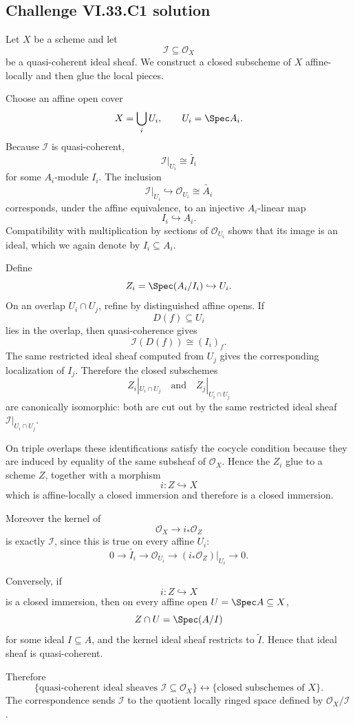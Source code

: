 
\subsection*{Challenge VI.33.C1 solution}
\begin{solution}
Let \(X\) be a scheme and let
\[
\mathcal I\subseteq\mathcal O_X
\]
be a quasi-coherent ideal sheaf.  We construct a closed subscheme of \(X\) affine-locally and then glue the local
pieces.

Choose an affine open cover
\[
X=\bigcup_iU_i,
\qquad
U_i=\Spec A_i.
\]
Because \(\mathcal I\) is quasi-coherent,
\[
\mathcal I|_{U_i}\cong\widetilde{I_i}
\]
for some \(A_i\)-module \(I_i\).  The inclusion
\[
\mathcal I|_{U_i}\hookrightarrow\mathcal O_{U_i}\cong\widetilde{A_i}
\]
corresponds, under the affine equivalence, to an injective \(A_i\)-linear map
\[
I_i\hookrightarrow A_i.
\]
Compatibility with multiplication by sections of \(\mathcal O_{U_i}\) shows that its image is an ideal, which we
again denote by \(I_i\subseteq A_i\).

Define
\[
Z_i=\Spec(A_i/I_i)
\hookrightarrow
U_i.
\]
On an overlap \(U_i\cap U_j\), refine by distinguished affine opens.  If
\[
D(f)\subseteq U_i
\]
lies in the overlap, then quasi-coherence gives
\[
\mathcal I(D(f))
\cong
(I_i)_f.
\]
The same restricted ideal sheaf computed from \(U_j\) gives the corresponding localization of \(I_j\). Therefore
the closed subschemes
\[
Z_i|_{U_i\cap U_j}
\quad\text{and}\quad
Z_j|_{U_i\cap U_j}
\]
are canonically isomorphic: both are cut out by the same restricted ideal sheaf
\(\mathcal I|_{U_i\cap U_j}\).

On triple overlaps these identifications satisfy the cocycle condition because they are induced by equality of the
same subsheaf of \(\mathcal O_X\).  Hence the \(Z_i\) glue to a scheme \(Z\), together with a morphism
\[
i:Z\hookrightarrow X
\]
which is affine-locally a closed immersion and therefore is a closed immersion.

Moreover the kernel of
\[
\mathcal O_X\longrightarrow i_*\mathcal O_Z
\]
is exactly \(\mathcal I\), since this is true on every affine \(U_i\):
\[
0\to\widetilde{I_i}
\to\mathcal O_{U_i}
\to(i_*\mathcal O_Z)|_{U_i}
\to0.
\]

Conversely, if
\[
i:Z\hookrightarrow X
\]
is a closed immersion, then on every affine open \(U=\Spec A\subseteq X\),
\[
Z\cap U=\Spec(A/I)
\]
for some ideal \(I\subseteq A\), and the kernel ideal sheaf restricts to \(\widetilde I\). Hence that ideal sheaf is
quasi-coherent.

Therefore
\[
\boxed{
\{\text{quasi-coherent ideal sheaves }\mathcal I\subseteq\mathcal O_X\}
\longleftrightarrow
\{\text{closed subschemes of }X\}.
}
\]
The correspondence sends \(\mathcal I\) to the quotient locally ringed space defined by
\(\mathcal O_X/\mathcal I\).
\end{solution}

